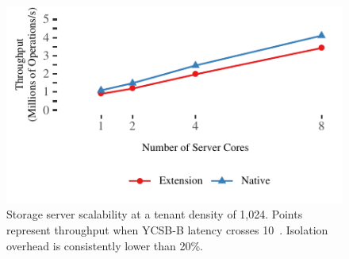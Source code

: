 \begin{figure}[t]
\centering
\includegraphics[width=1.0\columnwidth]{graphs/server-scalability.pdf}
\caption{Storage server scalability at a tenant density of 1,024. Points
	represent throughput when YCSB-B latency crosses 10~\us.
	Isolation overhead is consistently lower than 20\%.}
\label{fig:server-scalability}
\end{figure}
